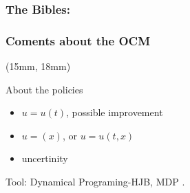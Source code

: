 \begin{frame}
\begin{textblock*}{72mm}
\begin{graybox}
          \end{graybox}
       \end{textblock*}
\end{frame}
\begin{frame}
    \frametitle{The Bibles:}
\end{frame}
\begin{frame}
    \frametitle{Coments about the OCM}
    \begin{textblock*}{72mm}(15mm, 18mm)
        \begin{graybox}{About the policies}
            \begin{itemize}
                \item
                 $u = u(t)$, possible improvement
                \item
                 $u = (x)$, or $u = u(t,x)$ 
                \item
                    uncertinity
            \end{itemize}
        Tool: Dynamical Programing-HJB, MDP .
        \end{graybox}    
    \end{textblock*}
\end{frame}
